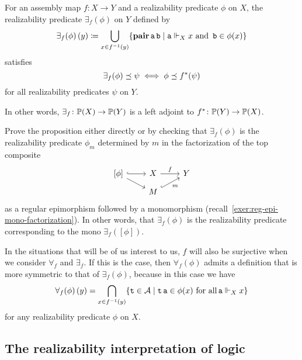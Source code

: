 \begin{proposition}
  For an assembly map \(f \colon X \to Y\) and a realizability predicate
  \(\phi\) on \(X\), the realizability predicate \(\exists_f(\phi)\) on \(Y\)
  defined by
  \[
    {\exists_f(\phi)}\,(y) \coloneqq
    \bigcup_{x \in f^{-1}(y)}\{\operatorname{\mathbf{pair}}\operatorname{\mathtt{a}}\operatorname{\mathtt{b}}
      \mid \operatorname{\mathtt{a}} \Vdash_X x \text{ and } \operatorname{\mathtt{b}} \in \phi(x)\}
  \]
  satisfies
  \[
    \exists_f(\phi) \preceq \psi \iff \phi \preceq f^\ast(\psi)
  \]
  for all realizability predicates \(\psi\) on \(Y\).

  In other words, \(\exists_f \colon \mathbb P(X) \to \mathbb P(Y)\) is a left
  adjoint to \(f^\ast \colon \mathbb P(Y) \to \mathbb P(X)\).
\end{proposition}
\begin{exercise}\label{exer:exists-predicate}
  Prove the proposition either directly or by checking that \(\exists_f(\phi)\)
  is the realizability predicate \(\phi_m\) determined by \(m\) in the
  factorization of the top composite
  \[
    \begin{tikzcd}[row sep=2mm,column sep=8mm]
      {[\phi]} \ar[dr] \ar[r,hookrightarrow] & X \ar[r,"f"] & Y \\
      & M \ar[ur,hookrightarrow,"m"']
    \end{tikzcd}
  \]
  as a regular epimorphism followed by a monomorphism
  (recall~\cref{exer:reg-epi-mono-factorization}).
  In other words, that \(\exists_f(\phi)\) is the realizability predicate
  corresponding to the mono \(\exists_f([\phi])\).
\end{exercise}

In the situations that will be of us interest to us, \(f\) will also be
surjective when we consider \(\forall_f\) and \(\exists_f\).
%
If this is the case, then \(\forall_f(\phi)\) admits a definition that is more
symmetric to that of \(\exists_f(\phi)\), because in this case we have
\[
  \forall_f(\phi)\,(y) = \bigcap_{x \in f^{-1}(y)}
  \{\operatorname{\mathtt{t}} \in \mathcal A \mid
    \operatorname{\mathtt{t}}\operatorname{\mathtt{a}} \in \phi(x) \text{ for all} \operatorname{\mathtt{a}} \Vdash_X x\}
\]
for any realizability predicate \(\phi\) on \(X\).

\subsection{The realizability interpretation of logic}

